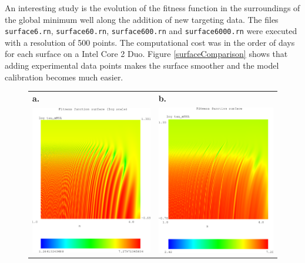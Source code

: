 \documentclass[a4paper, 11pt]{article}
\begin{document}
  An interesting study is the evolution of the fitness function in the surroundings of the global minimum well along the addition of new targeting data.
  The files \texttt{surface6.rn}, \texttt{surface60.rn}, \texttt{surface600.rn} and \texttt{surface6000.rn} were executed with a resolution of 500 points. 
  The computational cost was in the order of days for each surface on a Intel Core 2 Duo.
  Figure \ref{surfaceComparison} shows that adding experimental data points makes the surface smoother and the model calibration becomes much easier.
  \begin{figure}
    \begin{center}
      \begin{tabular}{cc}
        \multicolumn{1}{l}{\mbox{\bf a.}} & \multicolumn{1}{l}{\mbox{\bf b.}} \\
        \includegraphics[bb=120 300 500 660,clip,width=.6\linewidth]{figures/6repressilator.eps}&\includegraphics[bb=120 300 500 660,clip,width=.6\linewidth]{figures/60repressilator.eps}\\

\end{tabular}
\end{center}
\end{figure}
\end{document}
